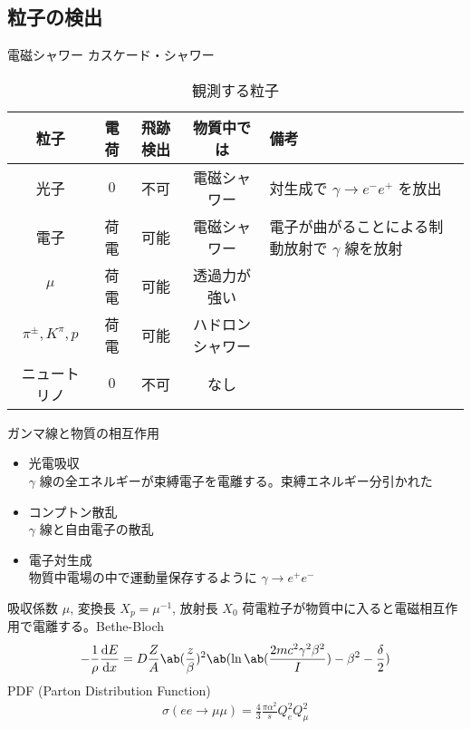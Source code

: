 \documentclass[a4paper,11pt]{jlreq}
\begin{document}
\subsection{粒子の検出}
電磁シャワー
カスケード・シャワー
\begin{table}[h]
  \centering
  \begin{tabular}{|c|cccl|}
    \hline
    粒子                  & 電荷  & 飛跡検出 & 物質中では    & 備考                             \\
    \hline
    光子                  & $0$ & 不可   & 電磁シャワー   & 対生成で $\gamma \to e^-e^+$ を放出   \\
    電子                  & 荷電  & 可能   & 電磁シャワー   & 電子が曲がることによる制動放射で $\gamma$ 線を放射 \\
    $\mu$               & 荷電  & 可能   & 透過力が強い   &                                \\
    $\pi^\pm, K^\pi, p$ & 荷電  & 可能   & ハドロンシャワー &                                \\
    ニュートリノ              & $0$ & 不可   & なし       &                                \\
    \hline
  \end{tabular}
  \caption{観測する粒子}
  \label{table:measure}
\end{table}

ガンマ線と物質の相互作用
\begin{itemize}
  \item 光電吸収 \\
        $\gamma$ 線の全エネルギーが束縛電子を電離する。束縛エネルギー分引かれた
  \item コンプトン散乱 \\
        $\gamma$ 線と自由電子の散乱
  \item 電子対生成 \\
        物質中電場の中で運動量保存するように $\gamma \to e^+e^-$
\end{itemize}
吸収係数 $\mu$, 変換長 $X_p = \mu^{-1}$, 放射長 $X_0$
荷電粒子が物質中に入ると電磁相互作用で電離する。Bethe-Bloch
\begin{align}
  -\frac{1}{\rho}\diff{E}{x} = D\frac{Z}{A}\ab(\frac{z}{\beta})^2\ab(\ln\ab(\frac{2mc^2\gamma^2\beta^2}{I}) - \beta^2 - \frac{\delta}{2})
\end{align}
PDF (Parton Distribution Function)
\begin{align}
  \sigma(ee\to\mu\mu) = \frac{4}{3}\frac{\pi\alpha^2}{s}Q_e^2Q_\mu^2
\end{align}
\end{document}
